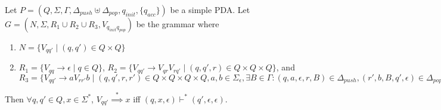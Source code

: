 \documentclass[a4paper]{article}
\newcommand{\derives}{\stackrel{*}{\implies}}
\newcommand{\changesto}{\vdash}
\begin{document}
\begin{theorem}
    Let $P = (Q, \Sigma, \Gamma, \Delta_{push} \uplus \Delta_{pop}, q_{init}, \{q_{acc}\})$ be a simple PDA. Let $G = (N, \Sigma, R_1 \cup R_2 \cup R_3, V_{q_{init}q_{pop}})$ be the grammar where
    \begin{enumerate}
        \item $N = \{V_{qq'} \mid (q, q') \in Q \times Q\}$
        \item $R_1 = \{V_{qq} \to \epsilon \mid q \in Q\}$, $R_2 = \{V_{qq'} \to V_{qr}V_{rq'} \mid (q, q', r) \in Q \times Q \times Q\}$, and $R_3 = \{V_{qq'} \to aV_{rr'}b \mid (q, q', r,r') \in
            Q\times Q \times Q \times Q, a, b \in \Sigma_\epsilon, \exists B \in \Gamma: (q, a, \epsilon, r, B) \in \Delta_{push}, (r', b, B, q', \epsilon) \in \Delta_{pop}\}$
    \end{enumerate}
    Then $\forall q, q' \in Q, x \in \Sigma^*$, $V_{qq'} \derives x$ iff $(q, x, \epsilon) \changesto^* (q', \epsilon, \epsilon)$.
\end{theorem}
\end{document}
